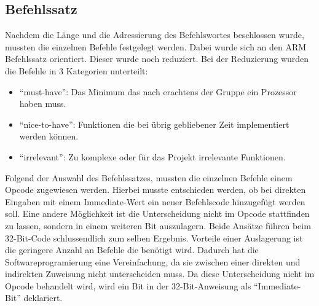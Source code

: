 \documentclass[paper=a4,fontsize=12pt,twocolumn]{scrreprt}
\begin{document}
\subsection{Befehlssatz}
{\color{red}
Nachdem die Länge und die Adressierung des Befehlswortes beschlossen wurde, mussten die einzelnen Befehle festgelegt werden.
Dabei wurde sich an den ARM Befehlssatz orientiert\footnotemark.
Dieser wurde noch reduziert. Bei der Reduzierung wurden die Befehle in 3 Kategorien unterteilt:
\begin{itemize}
    \item \enquote{must-have}:
    Das Minimum das nach erachtens der Gruppe ein Prozessor haben muss.
    \item \enquote{nice-to-have}:
    Funktionen die bei übrig gebliebener Zeit implementiert werden können.
    \item \enquote{irrelevant}:
    Zu komplexe oder für das Projekt irrelevante Funktionen.
\end{itemize}
}


Folgend der Auswahl des Befehlssatzes, mussten die einzelnen Befehle einem Opcode zugewiesen werden.
{\color{red} Hierbei musste entschieden werden, ob bei direkten Eingaben mit einem Immediate-Wert ein neuer Befehlscode hinzugefügt werden soll. Eine andere Möglichkeit ist  die Unterscheidung nicht im Opcode stattfinden zu lassen, sondern in einem weiteren Bit auszulagern. Beide Ansätze führen beim 32-Bit-Code schlussendlich zum selben Ergebnis. 
Vorteile einer Auslagerung ist die geringere Anzahl an Befehle die benötigt wird. Dadurch hat die Softwareprogramierung eine Vereinfachung, da sie zwischen einer direkten und indirekten Zuweisung nicht unterscheiden muss. Da diese Unterscheidung nicht im Opcode behandelt wird, wird ein Bit in der 32-Bit-Anweisung als \enquote{Immediate-Bit} deklariert.} 

\end{document}
